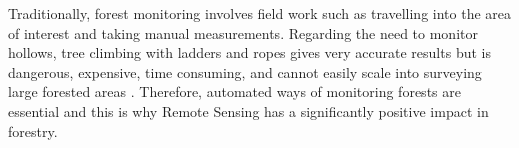 \documentclass{subfiles}
\begin{document}
Traditionally, forest monitoring involves field work such as travelling into the area of interest and taking manual measurements. Regarding the need to monitor hollows, tree climbing with ladders and ropes gives very accurate results but is dangerous, expensive, time consuming, and cannot easily scale into surveying large forested areas \cite{Harper2004}\cite{Rayner2011}. Therefore, automated ways of monitoring forests are essential and this is why Remote Sensing has a significantly positive impact in forestry. 
 
\end{document}
